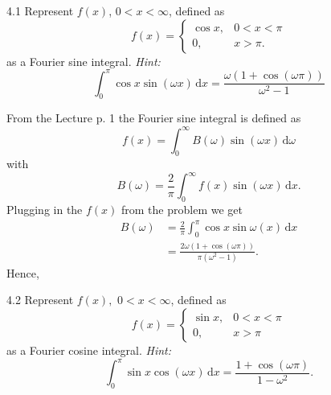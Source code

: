 
\begin{problem}{4.1}
Represent $f(x)$, $0 < x < \infty$, defined as
\[ 
f(x) = \begin{cases}
\cos x, & 0 < x < \pi\\
0, & x > \pi
.\end{cases}
\]
as a Fourier sine integral.
\textit{Hint:}
\[ 
\int_{0}^{\pi} \cos x \sin \left( \omega x \right) \, \mathrm{d}x = \frac{\omega \left( 1 + \cos \left( \omega \pi \right) \right)}{\omega^2 - 1}
\]
\end{problem}

\begin{derivation}
  From the Lecture p. 1 the Fourier sine integral is defined as
  \begin{equation*}
    f(x) = \int_{0}^{\infty} B(\omega) \sin(\omega x) \, \mathrm{d}\omega
  \end{equation*}
  with
  \begin{equation*}
    B(\omega) = \frac{2}{\pi} \int_{0}^{\infty} f(x) \sin(\omega x) \, \mathrm{d}x
  .\end{equation*}
  Plugging in the $f(x)$ from the problem we get
  \begin{align*}
    B(\omega) &= \frac{2}{\pi} \int_{0}^{\pi} \cos x \sin \omega(x) \, \mathrm{d}x \\
    &= \frac{2\omega \left( 1 + \cos (\omega \pi) \right)}{\pi \left( \omega^2 - 1 \right)}
  .\end{align*}
  Hence,
\end{derivation}



\begin{problem}{4.2}
  Represent $f(x),$ $0 < x < \infty$, defined as
\[ 
f(x) = \begin{cases}
\sin x, & 0 < x < \pi \\
0, & x > \pi
\end{cases}
\]
as a Fourier cosine integral.
\textit{Hint:}
\[ 
\int_{0}^{\pi} \sin x \cos \left( \omega x \right) \, \mathrm{d}x = \frac{1 + \cos \left( \omega \pi \right)}{1 - \omega^2}
.\]
\end{problem}

